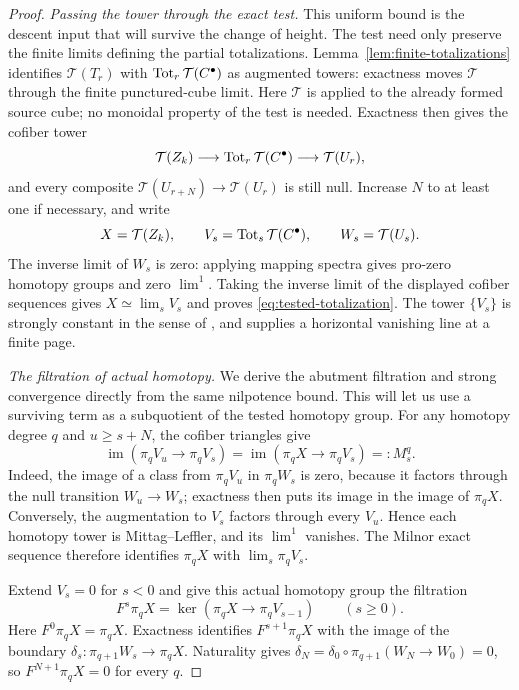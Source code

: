 \begin{proof}
\smallskip\noindent\emph{Passing the tower through the exact test.}
This uniform bound is the descent input that will survive the change
of height. The test need only preserve the finite limits defining the
partial totalizations.
Lemma~\ref{lem:finite-totalizations} identifies
$\mathcal T(T_r)$ with $\operatorname{Tot}_r\mathcal T(C^\bullet)$ as augmented towers:
exactness moves $\mathcal T$ through the finite punctured-cube limit.
Here $\mathcal T$ is applied to the already formed source cube; no
monoidal property of the test is needed.  Exactness then gives the cofiber tower
\[
  \mathcal T(Z_k)\longrightarrow
       \operatorname{Tot}_r\mathcal T(C^\bullet)\longrightarrow\mathcal T(U_r),
\]
and every composite $\mathcal T(U_{r+N})\to\mathcal T(U_r)$ is still
null.  Increase $N$ to at least one if necessary, and write
\[
 X=\mathcal T(Z_k),\qquad
 V_s=\operatorname{Tot}_s\mathcal T(C^\bullet),\qquad W_s=\mathcal T(U_s).
\]
The inverse limit of $W_s$ is zero: applying mapping spectra gives
pro-zero homotopy groups and zero $\lim^1$.  Taking the inverse limit
of the displayed cofiber sequences gives $X\simeq\lim_sV_s$ and proves
\eqref{eq:tested-totalization}.  The tower $\{V_s\}$ is strongly
constant in the sense of \cite[Definition~4.2]{Mathew16}, and
\cite[Proposition~4.3]{Mathew16} supplies a horizontal vanishing line
at a finite page.

\smallskip\noindent\emph{The filtration of actual homotopy.}
We derive the abutment filtration and strong convergence directly from
the same nilpotence bound. This will let us use a surviving term as a
subquotient of the tested homotopy group.
For any homotopy degree $q$ and $u\ge s+N$, the cofiber triangles give
\[
 \operatorname{im}(\pi_qV_u\longrightarrow\pi_qV_s)
 =\operatorname{im}(\pi_qX\longrightarrow\pi_qV_s)=:M_s^q.
\]
Indeed, the image of a class from $\pi_qV_u$ in $\pi_qW_s$ is zero,
because it factors through the null transition $W_u\to W_s$; exactness
then puts its image in the image of $\pi_qX$.  Conversely, the augmentation
to $V_s$ factors through every $V_u$.  Hence each homotopy tower is
Mittag--Leffler, and its $\lim^1$ vanishes.  The Milnor exact sequence
therefore identifies $\pi_qX$ with $\lim_s\pi_qV_s$.

Extend $V_s=0$ for $s<0$ and give this actual homotopy group the filtration
\[
 F^s\pi_qX=\ker(\pi_qX\longrightarrow\pi_qV_{s-1})\qquad(s\ge0).
\]
Here $F^0\pi_qX=\pi_qX$.  Exactness identifies $F^{s+1}\pi_qX$ with
the image of the boundary $\delta_s:\pi_{q+1}W_s\to\pi_qX$.
Naturality gives
$\delta_N=\delta_0\circ\pi_{q+1}(W_N\to W_0)=0$, so
$F^{N+1}\pi_qX=0$ for every $q$.


\end{proof}

